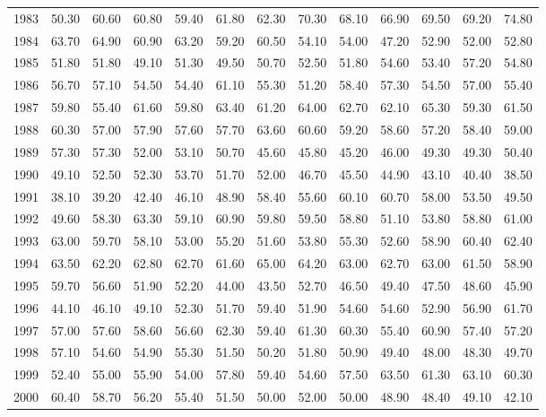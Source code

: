 \begin{longtable}{rrrrrrrrrrrrr}
  1983 & 50.30 & 60.60 & 60.80 & 59.40 & 61.80 & 62.30 & 70.30 & 68.10 & 66.90 & 69.50 & 69.20 & 74.80 \\ 
  1984 & 63.70 & 64.90 & 60.90 & 63.20 & 59.20 & 60.50 & 54.10 & 54.00 & 47.20 & 52.90 & 52.00 & 52.80 \\ 
  1985 & 51.80 & 51.80 & 49.10 & 51.30 & 49.50 & 50.70 & 52.50 & 51.80 & 54.60 & 53.40 & 57.20 & 54.80 \\ 
  1986 & 56.70 & 57.10 & 54.50 & 54.40 & 61.10 & 55.30 & 51.20 & 58.40 & 57.30 & 54.50 & 57.00 & 55.40 \\ 
  1987 & 59.80 & 55.40 & 61.60 & 59.80 & 63.40 & 61.20 & 64.00 & 62.70 & 62.10 & 65.30 & 59.30 & 61.50 \\ 
  1988 & 60.30 & 57.00 & 57.90 & 57.60 & 57.70 & 63.60 & 60.60 & 59.20 & 58.60 & 57.20 & 58.40 & 59.00 \\ 
  1989 & 57.30 & 57.30 & 52.00 & 53.10 & 50.70 & 45.60 & 45.80 & 45.20 & 46.00 & 49.30 & 49.30 & 50.40 \\ 
  1990 & 49.10 & 52.50 & 52.30 & 53.70 & 51.70 & 52.00 & 46.70 & 45.50 & 44.90 & 43.10 & 40.40 & 38.50 \\ 
  1991 & 38.10 & 39.20 & 42.40 & 46.10 & 48.90 & 58.40 & 55.60 & 60.10 & 60.70 & 58.00 & 53.50 & 49.50 \\ 
  1992 & 49.60 & 58.30 & 63.30 & 59.10 & 60.90 & 59.80 & 59.50 & 58.80 & 51.10 & 53.80 & 58.80 & 61.00 \\ 
  1993 & 63.00 & 59.70 & 58.10 & 53.00 & 55.20 & 51.60 & 53.80 & 55.30 & 52.60 & 58.90 & 60.40 & 62.40 \\ 
  1994 & 63.50 & 62.20 & 62.80 & 62.70 & 61.60 & 65.00 & 64.20 & 63.00 & 62.70 & 63.00 & 61.50 & 58.90 \\ 
  1995 & 59.70 & 56.60 & 51.90 & 52.20 & 44.00 & 43.50 & 52.70 & 46.50 & 49.40 & 47.50 & 48.60 & 45.90 \\ 
  1996 & 44.10 & 46.10 & 49.10 & 52.30 & 51.70 & 59.40 & 51.90 & 54.60 & 54.60 & 52.90 & 56.90 & 61.70 \\ 
  1997 & 57.00 & 57.60 & 58.60 & 56.60 & 62.30 & 59.40 & 61.30 & 60.30 & 55.40 & 60.90 & 57.40 & 57.20 \\ 
  1998 & 57.10 & 54.60 & 54.90 & 55.30 & 51.50 & 50.20 & 51.80 & 50.90 & 49.40 & 48.00 & 48.30 & 49.70 \\ 
  1999 & 52.40 & 55.00 & 55.90 & 54.00 & 57.80 & 59.40 & 54.60 & 57.50 & 63.50 & 61.30 & 63.10 & 60.30 \\ 
  2000 & 60.40 & 58.70 & 56.20 & 55.40 & 51.50 & 50.00 & 52.00 & 50.00 & 48.90 & 48.40 & 49.10 & 42.10 \\ 

\end{longtable}
